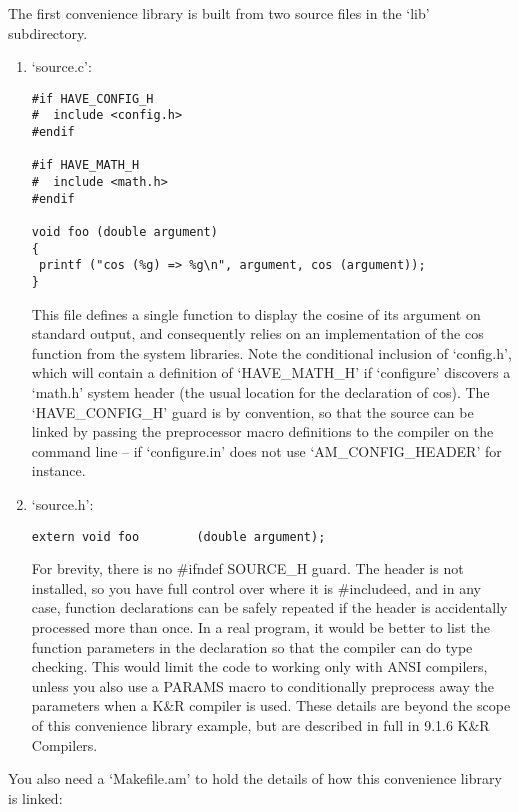 The first convenience library is built from two source files in the `lib' 
subdirectory.

\begin{enumerate}
\item `source.c': 

\begin{Verbatim}[frame=single]
#if HAVE_CONFIG_H
#  include <config.h>
#endif

#if HAVE_MATH_H
#  include <math.h>
#endif

void foo (double argument)
{
 printf ("cos (%g) => %g\n", argument, cos (argument));
}
\end{Verbatim}

This file defines a single function to display the cosine of its argument on standard output, and consequently relies on an implementation of the cos function from the system libraries. Note the conditional inclusion of `config.h', which will contain a definition of `HAVE\_{}MATH\_{}H' if `configure' discovers a `math.h' system header (the usual location for the declaration of cos). The `HAVE\_{}CONFIG\_{}H' guard is by convention, so that the source can be linked by passing the preprocessor macro definitions to the compiler on the command line -- if `configure.in' does not use `AM\_{}CONFIG\_{}HEADER' for instance. 


\item `source.h':

\begin{Verbatim}[frame=single]
extern void foo        (double argument);
\end{Verbatim}

For brevity, there is no \#ifndef SOURCE\_{}H guard. The header is not installed,
so you have full control over where it is \#includeed, and in any case,
function declarations can be safely repeated if the header is accidentally 
processed more than once. In a real program, it would be better to list the 
function parameters in the declaration so that the compiler can do type 
checking. This would limit the code to working only with ANSI compilers,
unless you also use a PARAMS macro to conditionally preprocess away the 
parameters when a K\&R compiler is used. These details are beyond the scope 
of this convenience library example, but are described in full in 9.1.6 K\&R 
Compilers. 
\end{enumerate}

You also need a `Makefile.am' to hold the details of how this convenience library is linked: 



